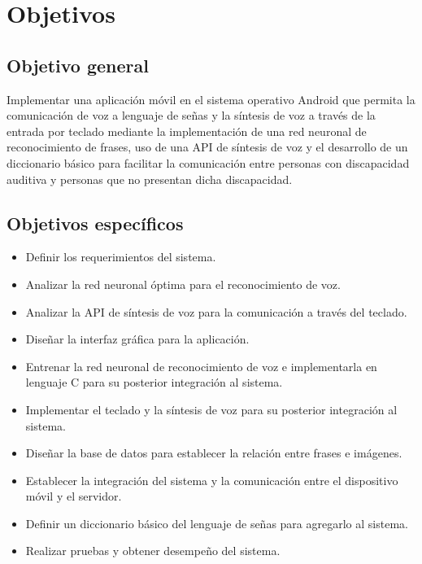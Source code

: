 
\section{Objetivos}

		\subsection*{Objetivo general}
			Implementar una aplicación móvil en el sistema operativo Android que permita la comunicación de voz a lenguaje de señas y la síntesis de voz a través de la entrada por teclado mediante la implementación de una red neuronal de reconocimiento de frases, uso de una API de síntesis de voz y el desarrollo de un diccionario básico para facilitar la comunicación entre personas con discapacidad auditiva y personas que no presentan dicha discapacidad.
		\subsection*{Objetivos específicos}
		\begin{itemize}
			\item Definir los requerimientos del sistema.
			\item Analizar la red neuronal óptima para el reconocimiento de voz.
			\item Analizar la API de síntesis de voz para la comunicación a través del teclado.
			\item Diseñar la interfaz gráfica para la aplicación.
			\item Entrenar la red neuronal de reconocimiento de voz e implementarla en lenguaje C para su posterior integración al sistema.
			\item Implementar el teclado y la síntesis de voz para su posterior integración al sistema.
			\item Diseñar la base de datos para establecer la relación entre frases e imágenes.
			\item Establecer la integración del sistema y la comunicación entre el dispositivo móvil y el servidor.
			\item Definir un diccionario básico del lenguaje de señas para agregarlo al sistema.
			\item Realizar pruebas y obtener desempeño del sistema.
		\end{itemize}

